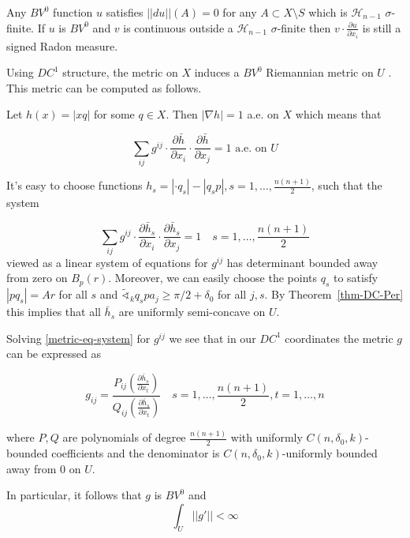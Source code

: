 \documentclass[12pt,leqno]{amsart}
\numberwithin{equation}{section}
\theoremstyle{definition}
\theoremstyle{remark}
\begin{document}
Any $BV^0$ function $u$ satisfies $||du||(A)=0$ for any $A\subset X\setminus S$ which is $\mathcal H_{n-1}$  $\sigma$-finite. If $u$ is $BV^0$ and $v$ is continuous outside a $\mathcal H_{n-1}$  $\sigma$-finite then
$v\cdot\frac{\partial u}{\partial x_i}$ is still a signed Radon measure.

Using $DC^1$ structure, the metric on $X$ induces a $BV^0$ Riemannian metric on $U$ \cite{Per-DC}. This metric can be computed as follows.

Let $h(x)=|xq|$ for some $q\in X$. Then $|\nabla h|=1$ a.e. on $X$ which means that

\begin{equation*}\label{metric-eq-1}
\sum_{ij}g^{ij}\cdot \frac{\partial \bar h}{\partial x_i}\cdot \frac{\partial \bar h}{\partial x_j}= 1 \text{ a.e. on } U
\end{equation*}

It's easy to choose  functions $h_s=|\cdot q_s|-|q_sp|, s=1,\ldots,  \frac{n(n+1)}{2}$, such that the system

\begin{equation}\label{metric-eq-system}
\sum_{ij}g^{ij}\cdot \frac{\partial \bar h_s}{\partial x_i}\cdot \frac{\partial \bar h_s}{\partial x_j}= 1 \quad s=1,\ldots,  \frac{n(n+1)}{2}
\end{equation}
viewed as a linear system of equations for $g^{ij}$ has determinant bounded away from zero on $B_p(r)$. Moreover, we can easily choose the points $q_s$ to satisfy $|pq_s|=Ar$ for all $s$ and   $\tilde\sphericalangle_k q_spa_j\ge \pi/2+\delta_0$ for all $j,s$.
By Theorem~\ref{thm-DC-Per} this implies that all $\bar h_s$ are uniformly semi-concave on $U$.

Solving \eqref{metric-eq-system} for $g^{ij}$ we see that in our $DC^1$ coordinates the metric $g$ can be expressed as

\begin{equation}\label{metric}
g_{ij}=\frac{P_{ij}(\frac{\partial \bar h_s}{\partial x_t})}{Q_{ij}(\frac{\partial \bar h_s}{\partial x_t})}\quad s=1,\ldots, \frac{n(n+1)}{2},t=1,\ldots, n
\end{equation}

where %
 $P,Q$ are polynomials of degree $\frac{n(n+1)}{2}$ with uniformly $C(n,\delta_0,k)$-bounded coefficients and the denominator is $C(n,\delta_0,k)$-uniformly bounded away from $0$ on $U$.


In particular, it follows that $g$ is $BV^0$ and
\begin{equation}\label{g'-bounded}
\int_U||g'||<\infty
\end{equation}
\end{document}
